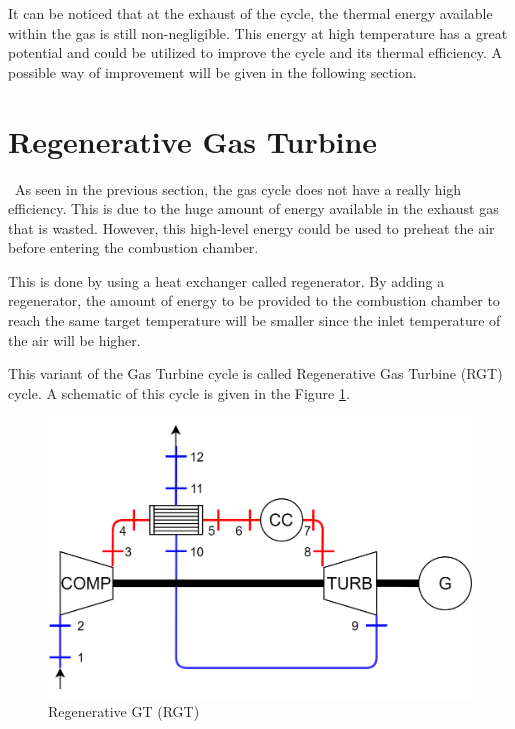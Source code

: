 It can be noticed that at the exhaust of the cycle, the thermal energy available within the gas is still non-negligible. This energy at high temperature has a great potential and could be utilized to improve the cycle and its thermal efficiency. A possible way of improvement will be given in the following section.\newpage

\section{Regenerative Gas Turbine}
\quad\, As seen in the previous section, the gas cycle does not have a really high efficiency. This is due to the huge amount of energy available in the exhaust gas that is wasted. However, this high-level energy could be used to preheat the air before entering the combustion chamber. 

This is done by using a heat exchanger called regenerator. By adding a regenerator, the amount of energy to be provided to the combustion chamber to reach the same target temperature will be smaller since the inlet temperature of the air will be higher.

This variant of the Gas Turbine cycle is called Regenerative Gas Turbine (RGT) cycle. A schematic of this cycle is given in the Figure \ref{fig:C5_RGT}.

\begin{figure}[h]
\centering
\includegraphics[scale=0.15]{RGT}
\caption{Regenerative GT (RGT)}
\label{fig:C5_RGT}
\end{figure}

